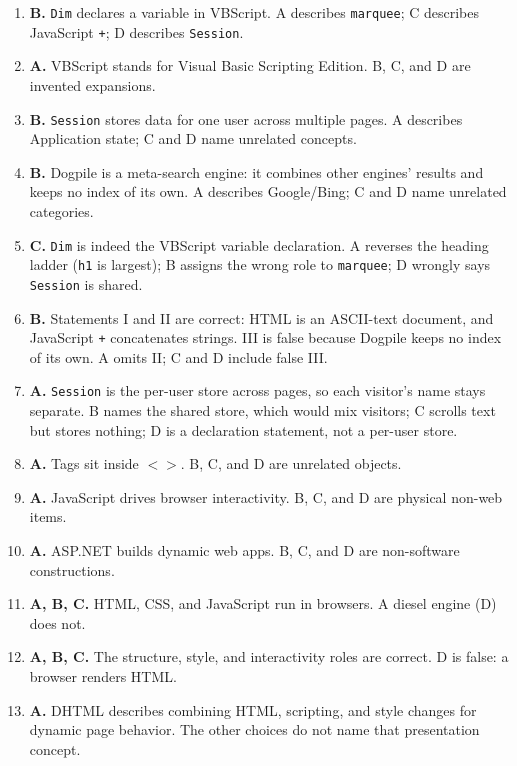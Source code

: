 \begin{enumerate}[label=\textbf{Q\arabic*.}, leftmargin=*]
  treats text as a numeric sum; D denies that \texttt{+} joins strings.
\item \textbf{B.} \texttt{Dim} declares a variable in VBScript. A describes
  \texttt{marquee}; C describes JavaScript \texttt{+}; D describes
  \texttt{Session}.
\item \textbf{A.} VBScript stands for Visual Basic Scripting Edition. B, C,
  and D are invented expansions.
\item \textbf{B.} \texttt{Session} stores data for one user across multiple
  pages. A describes Application state; C and D name unrelated concepts.
\item \textbf{B.} Dogpile is a meta-search engine: it combines other engines'
  results and keeps no index of its own. A describes Google/Bing; C and D name
  unrelated categories.
\item \textbf{C.} \texttt{Dim} is indeed the VBScript variable declaration.
  A reverses the heading ladder (\texttt{h1} is largest); B assigns the wrong
  role to \texttt{marquee}; D wrongly says \texttt{Session} is shared.
\item \textbf{B.} Statements I and II are correct: HTML is an ASCII-text
  document, and JavaScript \texttt{+} concatenates strings. III is false
  because Dogpile keeps no index of its own. A omits II; C and D include false
  III.
\item \textbf{A.} \texttt{Session} is the per-user store across pages, so each
  visitor's name stays separate. B names the shared store, which would mix
  visitors; C scrolls text but stores nothing; D is a declaration statement,
  not a per-user store.

\item \textbf{A.} Tags sit inside $< >$. B, C, and D are unrelated objects.
\item \textbf{A.} JavaScript drives browser interactivity. B, C, and D are physical non-web items.
\item \textbf{A.} ASP.NET builds dynamic web apps. B, C, and D are non-software constructions.
\item \textbf{A, B, C.} HTML, CSS, and JavaScript run in browsers. A diesel engine (D) does not.
\item \textbf{A, B, C.} The structure, style, and interactivity roles are correct. D is false: a browser renders HTML.
\item \textbf{A.} DHTML describes combining HTML, scripting, and style changes for dynamic page behavior. The other choices do not name that presentation concept.


\end{enumerate}
